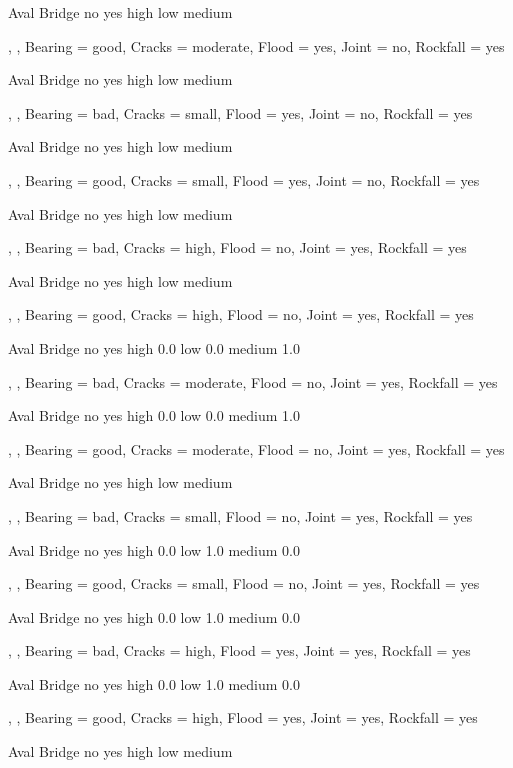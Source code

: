         Aval
Bridge   no yes
  high         
  low          
  medium       

, , Bearing = good, Cracks = moderate, Flood = yes, Joint = no, Rockfall = yes

        Aval
Bridge   no yes
  high         
  low          
  medium       

, , Bearing = bad, Cracks = small, Flood = yes, Joint = no, Rockfall = yes

        Aval
Bridge   no yes
  high         
  low          
  medium       

, , Bearing = good, Cracks = small, Flood = yes, Joint = no, Rockfall = yes

        Aval
Bridge   no yes
  high         
  low          
  medium       

, , Bearing = bad, Cracks = high, Flood = no, Joint = yes, Rockfall = yes

        Aval
Bridge   no yes
  high         
  low          
  medium       

, , Bearing = good, Cracks = high, Flood = no, Joint = yes, Rockfall = yes

        Aval
Bridge   no yes
  high      0.0
  low       0.0
  medium    1.0

, , Bearing = bad, Cracks = moderate, Flood = no, Joint = yes, Rockfall = yes

        Aval
Bridge    no yes
  high   0.0    
  low    0.0    
  medium 1.0    

, , Bearing = good, Cracks = moderate, Flood = no, Joint = yes, Rockfall = yes

        Aval
Bridge   no yes
  high         
  low          
  medium       

, , Bearing = bad, Cracks = small, Flood = no, Joint = yes, Rockfall = yes

        Aval
Bridge    no yes
  high   0.0    
  low    1.0    
  medium 0.0    

, , Bearing = good, Cracks = small, Flood = no, Joint = yes, Rockfall = yes

        Aval
Bridge   no yes
  high      0.0
  low       1.0
  medium    0.0

, , Bearing = bad, Cracks = high, Flood = yes, Joint = yes, Rockfall = yes

        Aval
Bridge    no yes
  high   0.0    
  low    1.0    
  medium 0.0    

, , Bearing = good, Cracks = high, Flood = yes, Joint = yes, Rockfall = yes

        Aval
Bridge   no yes
  high         
  low          
  medium       

